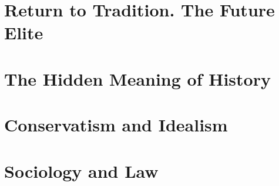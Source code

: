 \documentclass[a4paper,12pt,twoside]{book}
\begin{document}
\chapter{Return to Tradition. The Future Elite}












\chapter{The Hidden Meaning of History}






\chapter{Conservatism and Idealism}


















\chapter{Sociology and Law}
















\end{document}
